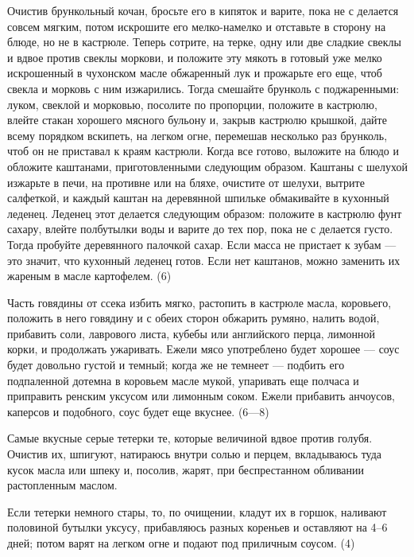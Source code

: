 Очистив брункольный кочан, бросьте его в кипяток и варите, пока не с делается совсем мягким, потом искрошите его мелко-намелко и отставьте в сторону на блюде, но не в кастрюле. Теперь сотрите, на терке, одну или две сладкие свеклы и вдвое против свеклы моркови, и положите эту мякоть в готовый уже мелко искрошенный в чухонском масле обжаренный лук и прожарьте его еще, чтоб свекла и морковь с ним изжарились. Тогда смешайте брунколь с поджаренными: луком, свеклой и морковью, посолите по пропорции, положите в кастрюлю, влейте стакан хорошего мясного бульону и, закрыв кастрюлю крышкой, дайте всему порядком вскипеть, на легком огне, перемешав несколько раз брунколь, чтоб он не приставал к краям кастрюли. Когда все готово, выложите на блюдо и обложите каштанами, приготовленными следующим образом. Каштаны с шелухой изжарьте в печи, на противне или на бляхе, очистите от шелухи, вытрите салфеткой, и каждый каштан на деревянной шпильке обмакивайте в кухонный леденец. Леденец этот делается следующим образом: положите в кастрюлю фунт сахару, влейте полбутылки воды и варите до тех пор, пока не с делается густо. Тогда пробуйте деревянного палочкой сахар. Если масса не пристает к зубам — это значит, что кухонный леденец готов. Если нет каштанов, можно заменить их жареным в масле картофелем. (6) 


Часть говядины от ссека избить мягко, растопить в кастрюле масла, коровьего, положить в него говядину и с обеих сторон обжарить румяно, налить водой, прибавить соли, лаврового листа, кубебы или английского перца, лимонной корки, и продолжать ужаривать. Ежели мясо употреблено будет хорошее — соус будет довольно густой и темный; когда же не темнеет — подбить его подпаленной дотемна в коровьем масле мукой, упаривать еще полчаса и приправить ренским уксусом или лимонным соком. Ежели прибавить анчоусов, каперсов и подобного, соус будет еще вкуснее. (6—8) 


Самые вкусные серые тетерки те, которые величиной вдвое против голубя. Очистив их, шпигуют, натираюсь внутри солью и перцем, вкладываюсь туда кусок масла или шпеку и, посолив, жарят, при беспрестанном обливании растопленным маслом. 

Если тетерки немного стары, то, по очищении, кладут их в горшок, наливают половиной бутылки уксусу, прибавляюсь разных кореньев и оставляют на 4--6 дней; потом варят на легком огне и подают под приличным соусом. (4) 

